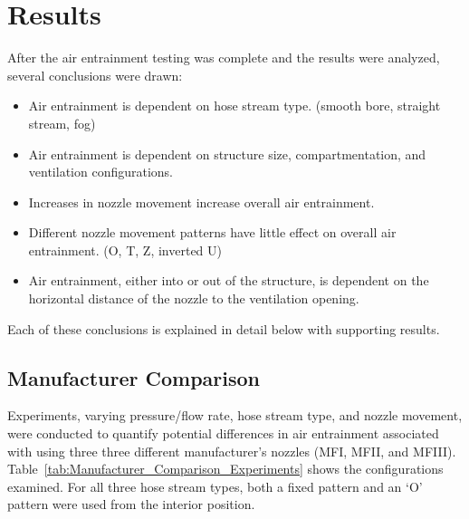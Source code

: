 \documentclass[12pt,oneside]{book}
\begin{document}
\clearpage

\chapter{Results}

\vspace*{\baselineskip}

After the air entrainment testing was complete and the results were analyzed, several conclusions were drawn:

\begin{itemize}
	\item Air entrainment is dependent on hose stream type. (smooth bore, straight stream, fog)
	\item Air entrainment is dependent on structure size, compartmentation, and ventilation configurations.
	\item Increases in nozzle movement increase overall air entrainment.
	\item Different nozzle movement patterns have little effect on overall air entrainment. (O, T, Z, inverted U)
	\item Air entrainment, either into or out of the structure, is dependent on the horizontal distance of the nozzle to the ventilation opening.
\end{itemize}

Each of these conclusions is explained in detail below with supporting results.

\section{Manufacturer Comparison}

\vspace*{\baselineskip}

Experiments, varying pressure/flow rate, hose stream type, and nozzle movement, were conducted to quantify potential differences in air entrainment associated with using three three different manufacturer's nozzles (MFI, MFII, and MFIII). Table~\ref{tab:Manufacturer_Comparison_Experiments} shows the configurations examined. For all three hose stream types, both a fixed pattern and an `O' pattern were used from the interior position.
\end{document}
